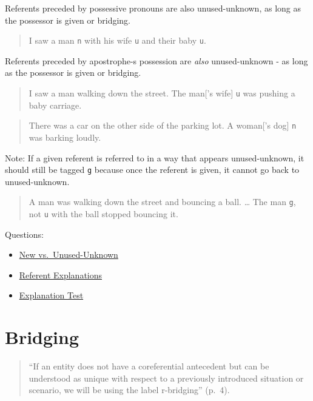 \documentclass[
]{book}
\providecommand{\tightlist}{%
  \setlength{\itemsep}{0pt}\setlength{\parskip}{0pt}}
\begin{document}
Referents preceded by possessive pronouns are also unused-unknown,
as long as the possessor is given or bridging.

\begin{quote}
I saw a man \texttt{n} with his wife \texttt{u} and their baby \texttt{u}.
\end{quote}

Referents preceded by apostrophe-s possession are \emph{also} unused-unknown -
as long as the possessor is given or bridging.

\begin{quote}
I saw a man walking down the street.
The man{[}'s wife{]} \texttt{u} was pushing a baby carriage.
\end{quote}

\begin{quote}
There was a car on the other side of the parking lot.
A woman{[}'s dog{]} \texttt{n} was barking loudly.
\end{quote}

Note:
If a given referent is referred to in a way that appears
unused-unknown, it should still be tagged \texttt{g}
because once the referent is given, it cannot go back to unused-unknown.

\begin{quote}
A man was walking down the street and bouncing a ball.
\ldots{}
The man \texttt{g}, not \texttt{u} with the ball stopped bouncing it.
\end{quote}

Questions:

\begin{itemize}
\tightlist
\item
  \protect\hyperlink{new-vs.-unused-unknown}{New vs.~Unused-Unknown}
\item
  \protect\hyperlink{referent-explanations}{Referent Explanations}
\item
  \protect\hyperlink{referent-explanation-test}{Explanation Test}
\end{itemize}

\hypertarget{bridging}{%
\section{Bridging}\label{bridging}}

\begin{quote}
``If an entity does not have a coreferential antecedent but can be understood as unique with respect to a previously introduced situation or scenario, we will be using the label r-bridging'' (p.~4).
\end{quote}
\end{document}
